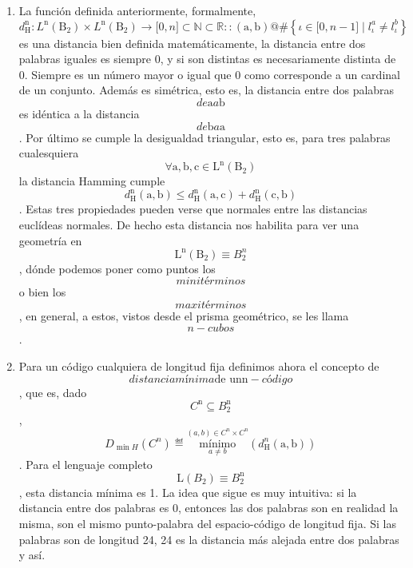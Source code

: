 \begin{enumerate}
\begin{enumerate}
\begin{enumerate}
      En palabras, es el número de bits que son diferentes entre ambas
      palabras (posición por posición).
    \item
      La función definida anteriormente, formalmente,\emph{
      \[d_{\mathtt{\mathrm{H}}}^{\mathtt{\mathrm{n}}}:L^{\mathtt{\mathrm{n}}}{\left( \mathtt{\mathrm{B_{2}}} \right) \times L^{\mathtt{\mathrm{n}}}}{{{\left( \mathtt{\mathrm{B_{2}}} \right)\rightarrow{\lbrack{0,n}\rbrack}} \subset \mathbb{N}} \subset \mathbb{R}}::\left( \mathtt{\mathrm{a,b}} \right)@\#\left\{ {{\iota \in {\lbrack{0,{n - 1}}\rbrack}} \mid {l_{\iota}^{a} \neq l_{\iota}^{b}}} \right\}\]}es
      una distancia bien definida matemáticamente, la distancia entre
      dos palabras iguales es siempre 0, y si son distintas es
      necesariamente distinta de 0. Siempre es un número mayor o igual
      que 0 como corresponde a un cardinal de un conjunto. Además es
      si\-métrica, esto es, la distancia entre dos palabras
      \[\mathit{de}\mathtt{\mathrm{a}}a\mathtt{\mathrm{b}}\] es idéntica
      a la distancia
      \[\mathit{de}\mathtt{\mathrm{b}}a\mathtt{\mathrm{a}}\]. Por último
      se cumple la desigualdad triangular, esto es, para tres palabras
      cuales\-quiera
      \[\forall{\mathtt{\mathrm{a,b,c}} \in \mathtt{\mathrm{L^{n}}}}\left( \mathtt{\mathrm{B_{2}}} \right)\]
      la distancia Hamming cumple
      \[d_{\mathtt{\mathrm{H}}}^{\mathtt{\mathrm{n}}}{\left( \mathtt{\mathrm{a,b}} \right) \leq {d_{\mathtt{\mathrm{H}}}^{\mathtt{\mathrm{n}}}{\left( \mathtt{\mathrm{a,c}} \right) + d_{\mathtt{\mathrm{H}}}^{\mathtt{\mathrm{n}}}}\left( \mathtt{\mathrm{c,b}} \right)}}\].
      Estas tres propiedades pueden verse que normales entre las
      distancias euclídeas normales. De hecho esta distancia nos
      habilita para ver una geometría
      en\[\mathtt{\mathrm{L^{n}}}{\left( \mathtt{\mathrm{B_{2}}} \right) \equiv B_{2}^{n}}\],
      dónde podemos poner como puntos los \[\mathit{minitérminos}\]o
      bien los \[\mathit{maxitérminos}\], en general, a estos, vistos
      desde el pris\-ma geométrico, se les llama \[n - \mathit{cubos}\].
    \item
      Para un código cualquiera de longitud fija definimos ahora el
      concepto de
      \[\mathit{distancia}\mathit{mínima}\text{de un}{\mathtt{\mathrm{n}} - \mathit{código}}\],
      que es, dado
      \[C^{\mathtt{\mathrm{n}}} \subseteq B_{2}^{\mathtt{\mathrm{n}}}\],
      \[D_{\min H}\left( C^{n} \right) ≝ \underset{a \neq b}{\overset{{({a,b})} \in {C^{n} \times C^{n}}}{\mathtt{\mathrm{mínimo}}}}\left( {d_{\mathtt{\mathrm{H}}}^{n}\left( \mathtt{\mathrm{a,b}} \right)} \right)\].
      Para el lenguaje completo
      \[\mathtt{\mathrm{L}}{\left( B_{2} \right) \equiv B_{2}^{\mathtt{\mathrm{n}}}}\],
      esta distancia mínima es 1. La idea que sigue es muy intuitiva: si
      la distancia entre dos palabras es 0, entonces las dos palabras
      son en realidad la misma, son el mismo pun\-to-palabra del
      espacio-código de longitud fija. Si las palabras son de longitud
      24, 24 es la distancia más alejada entre dos palabras y así.


\end{enumerate}
\end{enumerate}
\end{enumerate}
